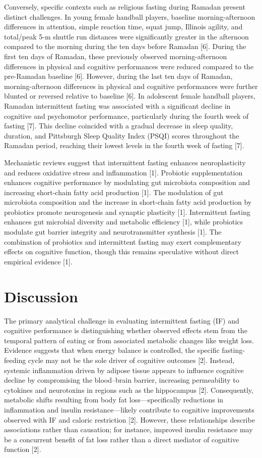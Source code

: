 \documentclass[conference]{IEEEtran}
\begin{document}
Conversely, specific contexts such as religious fasting during Ramadan present distinct challenges. In young female handball players, baseline morning-afternoon differences in attention, simple reaction time, squat jump, Illinois agility, and total/peak 5-m shuttle run distances were significantly greater in the afternoon compared to the morning during the ten days before Ramadan [6]. During the first ten days of Ramadan, these previously observed morning-afternoon differences in physical and cognitive performances were reduced compared to the pre-Ramadan baseline [6]. However, during the last ten days of Ramadan, morning-afternoon differences in physical and cognitive performances were further blunted or reversed relative to baseline [6]. In adolescent female handball players, Ramadan intermittent fasting was associated with a significant decline in cognitive and psychomotor performance, particularly during the fourth week of fasting [7]. This decline coincided with a gradual decrease in sleep quality, duration, and Pittsburgh Sleep Quality Index (PSQI) scores throughout the Ramadan period, reaching their lowest levels in the fourth week of fasting [7].

Mechanistic reviews suggest that intermittent fasting enhances neuroplasticity and reduces oxidative stress and inflammation [1]. Probiotic supplementation enhances cognitive performance by modulating gut microbiota composition and increasing short-chain fatty acid production [1]. The modulation of gut microbiota composition and the increase in short-chain fatty acid production by probiotics promote neurogenesis and synaptic plasticity [1]. Intermittent fasting enhances gut microbial diversity and metabolic efficiency [1], while probiotics modulate gut barrier integrity and neurotransmitter synthesis [1]. The combination of probiotics and intermittent fasting may exert complementary effects on cognitive function, though this remains speculative without direct empirical evidence [1].

\section{Discussion}
The primary analytical challenge in evaluating intermittent fasting (IF) and cognitive performance is distinguishing whether observed effects stem from the temporal pattern of eating or from associated metabolic changes like weight loss. Evidence suggests that when energy balance is controlled, the specific fasting-feeding cycle may not be the sole driver of cognitive outcomes [2]. Instead, systemic inflammation driven by adipose tissue appears to influence cognitive decline by compromising the blood–brain barrier, increasing permeability to cytokines and neurotoxins in regions such as the hippocampus [2]. Consequently, metabolic shifts resulting from body fat loss—specifically reductions in inflammation and insulin resistance—likely contribute to cognitive improvements observed with IF and caloric restriction [2]. However, these relationships describe associations rather than causation; for instance, improved insulin resistance may be a concurrent benefit of fat loss rather than a direct mediator of cognitive function [2].
\end{document}
